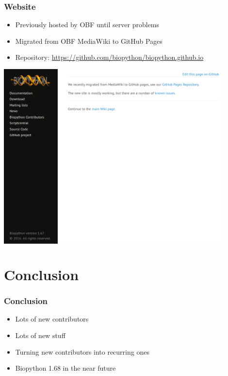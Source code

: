 \documentclass[trans]{beamer}
\begin{document}
\frame
{
  \frametitle{Website}

  \begin{itemize}
  \item Previously hosted by OBF until server problems
  \item Migrated from OBF MediaWiki to GitHub Pages
  \item Repository: \url{https://github.com/biopython/biopython.github.io}
  \end{itemize}

  \begin{center}
  \includegraphics[width=0.9\textwidth]{bp-website.png}
  \end{center}
}


\section{Conclusion}
\frame
{
  \frametitle{Conclusion}

  \begin{itemize}
  \item Lots of new contributors
  \item Lots of new stuff
  \item Turning new contributors into recurring ones
  \item Biopython 1.68 in the near future
  \end{itemize}
}
\end{document}
